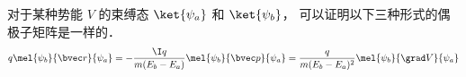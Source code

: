 
对于某种势能 $V$ 的束缚态 $\ket{\psi_a}$ 和 $\ket{\psi_b}$， 可以证明以下三种形式的偶极子矩阵是一样的．
\begin{equation}
q\mel{\psi_b}{\bvec r}{\psi_a} = -\frac{\I q}{m(E_b - E_a)}\mel{\psi_b}{\bvec p}{\psi_a} = \frac{q}{m(E_b-E_a)^2} \mel{\psi_b}{\grad V}{\psi_a}
\end{equation}

